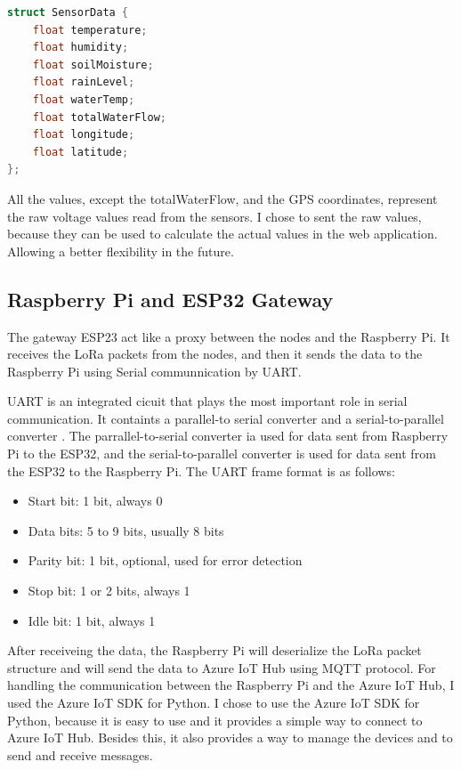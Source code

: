 \begin{lstlisting}[language=C, caption={Sensor reading structure}]
struct SensorData {
    float temperature;
    float humidity;
    float soilMoisture;
    float rainLevel;
    float waterTemp;
    float totalWaterFlow;
    float longitude;
    float latitude;
};
\end{lstlisting}

All the values, except the totalWaterFlow, and the GPS coordinates, represent the raw
voltage values read from the sensors. I chose to sent the raw values, 
because they can be used to calculate the actual values in the web application.
Allowing a better flexibility in the future.

\subsection{Raspberry Pi and ESP32 Gateway}
The gateway ESP23 act like a proxy between the nodes and the Raspberry Pi.
It receives the LoRa packets from the nodes, and then it sends the data to 
the Raspberry Pi using Serial communnication by UART.

UART is an integrated cicuit that plays the most important role in serial communication.
It containts a parallel-to serial converter and a serial-to-parallel converter\cite{uderstandingUart}
\cite{laddha2013review}. The 
parrallel-to-serial converter ia used for data sent from Raspberry Pi to the ESP32,
and the serial-to-parallel converter is used for data sent from the ESP32 to the Raspberry Pi.
The UART frame format is as follows:
\begin{itemize}
    \item Start bit: 1 bit, always 0
    \item Data bits: 5 to 9 bits, usually 8 bits
    \item Parity bit: 1 bit, optional, used for error detection
    \item Stop bit: 1 or 2 bits, always 1
    \item Idle bit: 1 bit, always 1
\end{itemize}

After receiveing the data, the Raspberry Pi will deserialize 
the LoRa packet structure and will send the data to Azure IoT Hub 
using MQTT protocol. For handling the communication between the 
Raspberry Pi and the Azure IoT Hub, I used the Azure IoT SDK for Python.
I chose to use the Azure IoT SDK for Python, 
because it is easy to use and it provides a simple way to connect to 
Azure IoT Hub. Besides this, it also provides a way to manage the devices and 
to send and receive messages.

